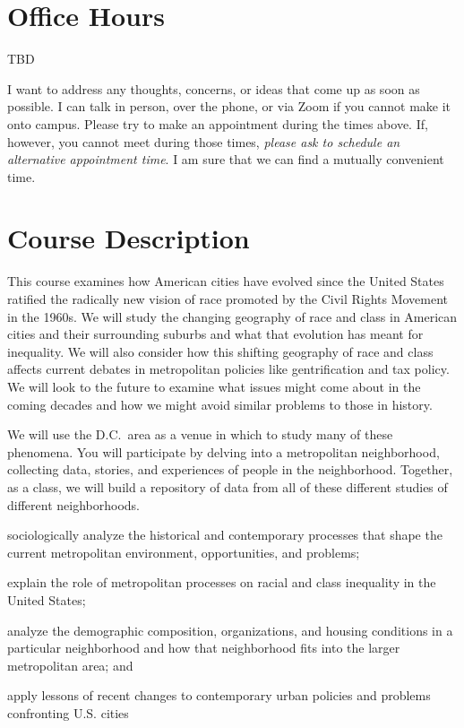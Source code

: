 \documentclass[11pt]{syllabus}
\author{Michael Bader}
\newcommand{\officehourtimes}{TBD}
\begin{document}
\maketitle 

\section{Office Hours}
\officehourtimes

I want to address any thoughts, concerns, or ideas that come up as soon as possible. I can talk in person, over the phone, or via Zoom if you cannot make it onto campus. Please try to make an appointment during the times above. If, however, you cannot meet during those times, \emph{please ask to schedule an alternative appointment time}. I am sure that we can find a mutually convenient time. 

\section{Course Description}
This course examines how American cities have evolved since the United States ratified the radically new vision of race promoted by the Civil Rights Movement in the 1960s. We will study the changing geography of race and class in American cities and their surrounding suburbs and what that evolution has meant for inequality. We will also consider how this shifting geography of race and class affects current debates in metropolitan policies like gentrification and tax policy. We will look to the future to examine what issues might come about in the coming decades and how we might avoid similar problems to those in history. 

We will use the D.C.~area as a venue in which to study many of these phenomena. You will participate by delving into a metropolitan neighborhood, collecting data, stories, and experiences of people in the neighborhood. Together, as a class, we will build a repository of data from all of these different studies of different neighborhoods. 

\begin{objectives}
\item sociologically analyze the historical and contemporary processes that shape the current metropolitan environment, opportunities, and problems;
\item explain the role of metropolitan processes on racial and class inequality in the United States;
\item analyze the demographic composition, organizations, and housing conditions in a particular neighborhood and how that neighborhood fits into the larger metropolitan area; and
\item apply lessons of recent changes to contemporary urban policies and problems confronting U.S. cities
\end{objectives}
\end{document}
